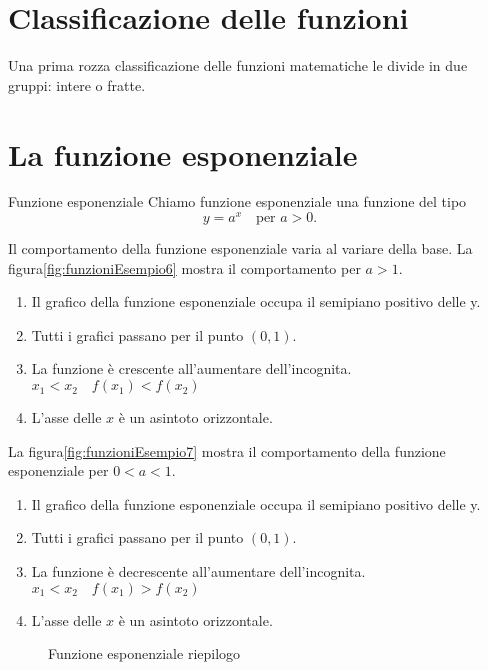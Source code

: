 \section{Classificazione delle funzioni}
Una prima rozza classificazione delle funzioni matematiche le divide in due gruppi: intere o fratte.  
\section{La funzione esponenziale}
\label{sec:LaFunzioneEsponenziale}
\begin{definizionet}{Funzione esponenziale}
	Chiamo funzione esponenziale una funzione del tipo \[y=a^x\quad
	\text{per $a>0$.} \]
\end{definizionet}
Il comportamento della funzione esponenziale varia al variare della base. La figura\nobs\vref{fig:funzioniEsempio6} mostra il comportamento per $a>1$.
\begin{enumerate}
\item Il grafico della funzione esponenziale occupa il semipiano positivo delle y.
\item Tutti i grafici passano per il punto $(0,1)$.
\item La funzione è crescente all'aumentare dell'incognita. $x_1<x_2\quad f(x_1)<f(x_2)$ 
\item L'asse delle $x$ è un asintoto orizzontale.
\end{enumerate}
 La figura\nobs\vref{fig:funzioniEsempio7} mostra il comportamento della funzione esponenziale per $0<a<1$. 
 \begin{enumerate}
 \item Il grafico della funzione esponenziale occupa il semipiano positivo delle y.
 \item Tutti i grafici passano per il punto $(0,1)$.
 \item La funzione è  decrescente all'aumentare dell'incognita. $x_1<x_2\quad f(x_1)>f(x_2)$ 
 \item L'asse delle $x$ è un asintoto orizzontale.
 \end{enumerate}
\begin{figure}
\centering
\caption{Funzione esponenziale riepilogo}
\label{fig:FunzioneExp}
\end{figure}
